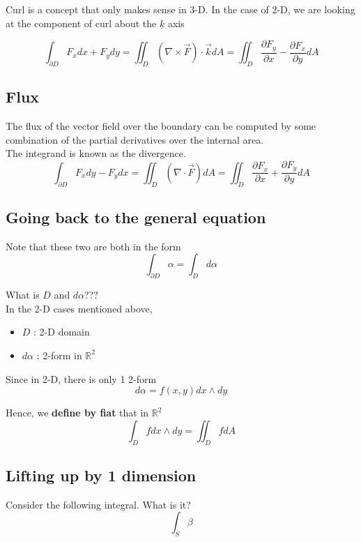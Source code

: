 Curl is a concept that only makes sense in 3-D. In the case of 2-D, we are looking at the component of curl about the $ \underline{k}$  axis

\[
   \int_{\partial D}^{}  F_x dx + F_y dy = \iint_{D} \left( \nabla \times \vec{F} \right) \cdot \vec{k} dA  = \iint_D \frac{\partial F_y}{\partial x} - \frac{\partial F_x}{\partial y} dA
\] 

\subsection{Flux}

The flux of the vector field over the boundary can be computed by some combination of the partial derivatives over the internal area. \\

The integrand is known as the divergence. \\

\[
  \int_{\partial D}^{}  F_x dy - F_y dx  = \iint_D \left( \nabla \cdot \vec{F} \right) dA = \iint_D \frac{\partial F_x}{\partial x} + \frac{\partial F_y}{\partial y} dA
\] 

\subsection{Going back to the general equation}

Note that these two are both in the form
\[
  \int_{\partial D}^{}  \alpha = \int_{D}^{} d\alpha  
\] 

What is $D$ and $d\alpha$??? \\

In the 2-D cases mentioned above, 
\begin{itemize}
   \item  $D$ : 2-D domain
   \item $d\alpha$ : 2-form in $\mathbb{R}^2$
\end{itemize}

Since in 2-D, there is only 1 2-form
\[
  d\alpha = f(x, y) dx \wedge dy
\] 

Hence, we \textbf{define by fiat} that in $\mathbb{R}^2$
\[
  \int_{D}^{} f dx \wedge dy = \iint_D f dA 
\] 

\subsection{Lifting up by 1 dimension}

Consider the following integral. What is it?
\[
  \int_{S}^{} \beta 
\] 

